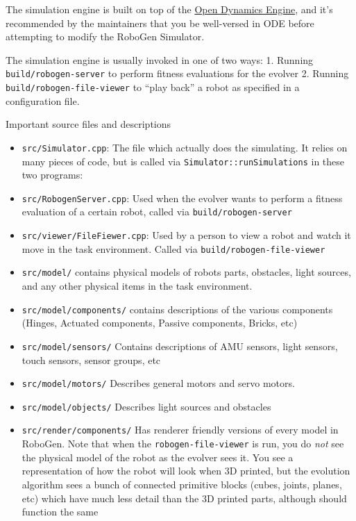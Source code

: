 The simulation engine is built on top of the
\href{http://www.ode.org/}{Open Dynamics Engine}, and it's recommended
by the maintainers that you be well-versed in ODE before attempting to
modify the RoboGen Simulator.

The simulation engine is usually invoked in one of two ways: 1. Running
\texttt{build/robogen-server} to perform fitness evaluations for the
evolver 2. Running \texttt{build/robogen-file-viewer} to ``play back'' a
robot as specified in a configuration file.

Important source files and descriptions
\begin{itemize}
    \item \texttt{src/Simulator.cpp}: The file which actually does the
        simulating. It relies on many pieces of code, but is called via
        \texttt{Simulator::runSimulations} in these two programs:
    \item \texttt{src/RobogenServer.cpp}: Used when the evolver wants
        to perform a fitness evaluation of a certain robot, called via
        \texttt{build/robogen-server}
    \item \texttt{src/viewer/FileFiewer.cpp}: Used by a person to view a robot
        and watch it move in the task environment.  Called via
        \texttt{build/robogen-file-viewer}
    \item \texttt{src/model/} contains physical models of robots parts,
        obstacles, light sources, and any other physical items in the task
        environment.
    \item \texttt{src/model/components/} contains descriptions of the various
        components (Hinges, Actuated components, Passive components, Bricks,
        etc)
    \item \texttt{src/model/sensors/} Contains descriptions of AMU sensors,
        light sensors, touch sensors, sensor groups, etc
    \item  \texttt{src/model/motors/} Describes general motors and servo motors.
    \item  \texttt{src/model/objects/} Describes light sources and obstacles
    \item  \texttt{src/render/components/} Has renderer friendly versions of
        every model in RoboGen. Note that when the \texttt{robogen-file-viewer}
        is run, you do \emph{not} see the physical model of the robot as the
        evolver sees it. You see a representation of how the robot will look
        when 3D printed, but the evolution algorithm sees a bunch of connected
        primitive blocks (cubes, joints, planes, etc) which have much less
        detail than the 3D printed parts, although should function the same
\end{itemize}

